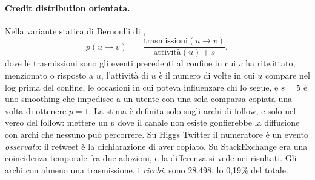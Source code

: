 \documentclass[11pt,a4paper]{article}
\newcommand{\sx}{StackExchange}
\newcommand{\hg}{Higgs Twitter}
\begin{document}
\paragraph{Credit distribution orientata.} Nella variante statica di Bernoulli di \citet{goyal2010},
\begin{equation}
  p(u \to v) \;=\; \frac{\mathrm{trasmissioni}(u \to v)}{\mathrm{attività}(u) + s},
  \label{eq:credit}
\end{equation}
dove le trasmissioni sono gli eventi precedenti al confine in cui $v$ ha ritwittato, menzionato o risposto a $u$, l'attività di $u$ è il numero di volte in cui $u$ compare nel log prima del confine, le occasioni in cui poteva influenzare chi lo segue, e $s = 5$ è uno smoothing che impedisce a un utente con una sola comparsa copiata una volta di ottenere $p = 1$. La stima è definita solo sugli archi di follow, e solo nel verso del follow: mettere un $p$ dove il canale non esiste gonfierebbe la diffusione con archi che nessuno può percorrere. Su \hg{} il numeratore è un evento \emph{osservato}: il retweet è la dichiarazione di aver copiato. Su \sx{} era una coincidenza temporale fra due adozioni, e la differenza si vede nei risultati. Gli archi con almeno una trasmissione, i \emph{ricchi}, sono 28.498, lo 0,19\% del totale.
\end{document}
